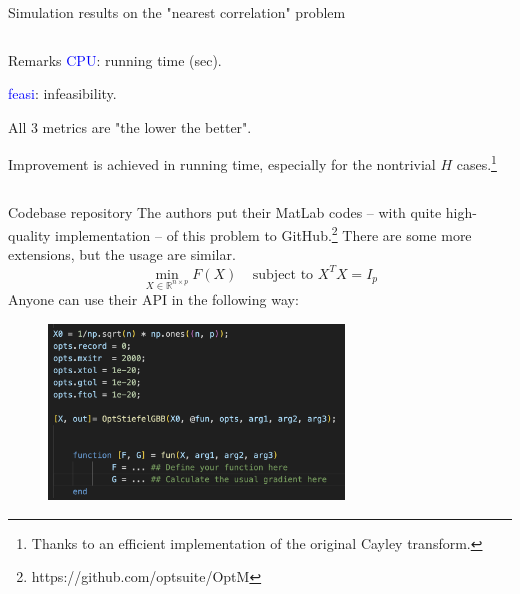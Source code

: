 \documentclass[aspectratio=43, 10pt]{beamer}
\begin{document}
\begin{frame}[t]{Simulation results on the "nearest correlation" problem}
\begin{columns}
\begin{column}{0.35\textwidth}
\begin{block}{Remarks}
                         \textcolor{blue}{CPU}: running time (sec). 
                         
                         \textcolor{blue}{feasi}: infeasibility. 
            
                    \vspace{0.3cm}
                    All 3 metrics are "the lower the better". 

                    \vspace{0.1cm}
                    Improvement is achieved in running time, especially for the nontrivial $H$ cases.\footnote{Thanks to an efficient implementation of the original Cayley transform.}
                    
                \end{block}
            \end{column}
        \end{columns}
    \end{frame}

    \begin{frame}[t]{Codebase repository}
        \vspace{-0.4cm}
        The authors put their MatLab codes -- with quite high-quality implementation -- of this problem to GitHub.\footnote{https://github.com/optsuite/OptM} There are some more extensions, but the usage are similar.  
        $$\min_{X \in \mathbb{R}^{n \times p}} F(X) ~~~~~ \text{subject to   } X^T X = I_p$$ Anyone can use their API in the following way: 

        \begin{figure}
            \centering
                \includegraphics[width=0.7\textwidth]{figures/API.png}
        \end{figure}
        
    \end{frame}



\end{document}
